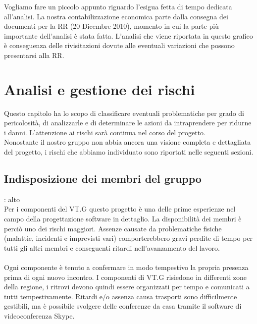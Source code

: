 \vspace{0.8cm}
 
Vogliamo fare un piccolo appunto riguardo l'esigua fetta di tempo dedicata
all'analisi. La nostra contabilizzazione economica parte dalla consegna dei documenti per 
la RR (20 Dicembre 2010), momento in cui la parte pi\`u importante dell'analisi \`e stata fatta.
L'analisi che viene riportata in questo grafico \`e conseguenza delle
rivisitazioni dovute alle eventuali variazioni che possono presentarsi alla RR.\\ 

\chapter{Analisi e gestione dei rischi}
\thispagestyle{fancy}

Questo capitolo ha lo scopo di classificare eventuali problematiche per grado
di pericolosit\`a, di analizzarle e di determinare le azioni da intraprendere per
ridurne i danni. L'attenzione ai rischi sar\`a continua nel corso del
progetto.\\ 
Nonostante il nostro gruppo non abbia ancora una visione completa e dettagliata del 
progetto, i rischi che abbiamo individuato sono riportati nelle seguenti sezioni.

\section{Indisposizione dei membri del gruppo}
: alto\\
Per i componenti del VT.G questo progetto \`e una delle prime esperienze nel campo della progettazione software in dettaglio. 
La disponibilit\`a dei membri \`e perci\`o uno dei rischi maggiori. 
Assenze causate da problematiche fisiche (malattie, incidenti e imprevisti vari) comporterebbero gravi perdite 
di tempo per tutti gli altri membri e conseguenti ritardi nell'avanzamento del
lavoro.\\
\\
Ogni componente \`e tenuto a confermare in modo tempestivo la propria presenza
prima di ogni nuovo incontro. I componenti di VT.G risiedono in differenti zone
della regione, i ritrovi devono quindi essere organizzati per tempo e comunicati
a tutti tempestivamente. Ritardi e/o assenza causa trasporti sono difficilmente
gestibili, ma \`e possibile svolgere delle conferenze da casa tramite il
software di videoconferenza Skype.

